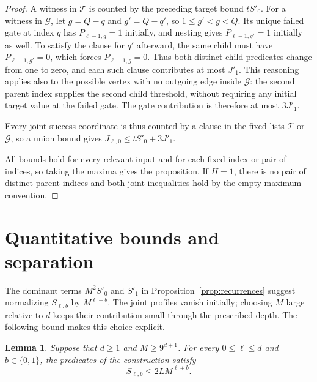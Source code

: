 \documentclass[11pt]{article}
\newtheorem{lemma}[theorem]{Lemma}
\theoremstyle{definition}
\theoremstyle{remark}
\begin{document}
\begin{proof}
A witness in $\mathcal T$ is counted by the preceding target bound
$tS'_0$.  For a witness in $\mathcal G$, let $g=Q-q$ and
$g'=Q-q'$, so $1\leq g'<g<Q$.  Its unique failed gate at index $q$
has $P_{\ell-1,g}=1$ initially, and nesting gives
$P_{\ell-1,g'}=1$ initially as well.  To satisfy the clause for
$q'$ afterward, the same child must have $P_{\ell-1,g'}=0$, which
forces $P_{\ell-1,g}=0$.  Thus both distinct child predicates change
from one to zero, and each such clause contributes at most $J'_1$.
This reasoning applies also to the possible vertex with no outgoing
edge inside $\mathcal G$: the second parent index supplies the
second child threshold, without requiring any initial target value
at the failed gate.  The gate contribution is therefore at most
$3J'_1$.

Every joint-success coordinate is thus counted by a clause in the fixed
lists $\mathcal T$ or $\mathcal G$, so a union bound gives
$J_{\ell,0}\leq tS'_0+3J'_1$.

All bounds hold for every relevant input and for each fixed index or
pair of indices, so taking the maxima gives the proposition.  If
$H=1$, there is no pair of distinct parent indices and both joint
inequalities hold by the empty-maximum convention.
\end{proof}

\section{Quantitative bounds and separation}
\label{sec:separation}

The dominant terms $M^2S'_0$ and $S'_1$ in
Proposition~\ref{prop:recurrences} suggest normalizing $S_{\ell,b}$ by
$M^{\ell+b}$. The joint profiles vanish initially; choosing $M$ large
relative to $d$ keeps their contribution small through the prescribed
depth. The following bound makes this choice explicit.

\begin{lemma}
\label{lem:quantitative-profiles}
Suppose that $d\geq 1$ and $M\geq 9^{d+1}$.
For every $0\leq\ell\leq d$ and $b\in\{0,1\}$, the predicates of the
construction satisfy
\[
  S_{\ell,b}\leq 2L M^{\ell+b}.
\]
\end{lemma}
\end{document}

